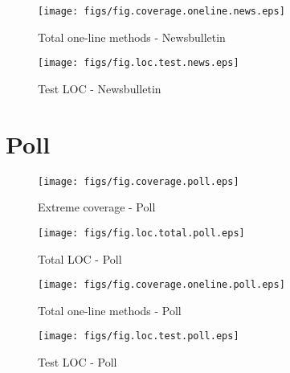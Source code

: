 \begin{figure}[htbp]
  \begin{minipage}[htbp]{.45\linewidth}
    \begin{center}
      \texttt{[image: figs/fig.coverage.oneline.news.eps]}
      \caption{Total one-line methods - Newsbulletin}
      \label{fig:coverage.oneline.test.news}
    \end{center}
  \end{minipage}
\hfill
  \begin{minipage}[htbp]{.45\linewidth}
    \begin{center}
      \texttt{[image: figs/fig.loc.test.news.eps]}
      \caption{Test LOC - Newsbulletin}
      \label{fig:loc.test.news}
    \end{center}
  \end{minipage}
\end{figure}

\clearpage


\section {Poll}

\begin{figure}[htbp]
  \begin{minipage}[htbp]{.45\linewidth}
    \begin{center}
      \texttt{[image: figs/fig.coverage.poll.eps]}
      \caption{Extreme coverage - Poll}
      \label{fig:coverage.poll}
    \end{center}
  \end{minipage}
\hfill
  \begin{minipage}[htbp]{.45\linewidth}
    \begin{center}
      \texttt{[image: figs/fig.loc.total.poll.eps]}
      \caption{Total LOC - Poll}
      \label{fig:loc.total.poll}
    \end{center}
  \end{minipage}
\end{figure}

\begin{figure}[htbp]
  \begin{minipage}[htbp]{.45\linewidth}
    \begin{center}
      \texttt{[image: figs/fig.coverage.oneline.poll.eps]}
      \caption{Total one-line methods - Poll}
      \label{fig:coverage.oneline.test.poll}
    \end{center}
  \end{minipage}
\hfill
  \begin{minipage}[htbp]{.45\linewidth}
    \begin{center}
      \texttt{[image: figs/fig.loc.test.poll.eps]}
      \caption{Test LOC - Poll}
      \label{fig:loc.test.poll}
    \end{center}
  \end{minipage}
\end{figure}


